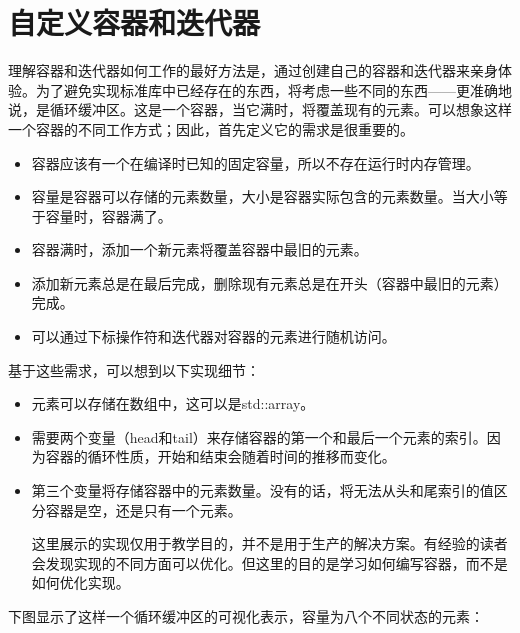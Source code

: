 \section{自定义容器和迭代器}

理解容器和迭代器如何工作的最好方法是，通过创建自己的容器和迭代器来亲身体验。为了避免实现标准库中已经存在的东西，将考虑一些不同的东西——更准确地说，是循环缓冲区。这是一个容器，当它满时，将覆盖现有的元素。可以想象这样一个容器的不同工作方式；因此，首先定义它的需求是很重要的。

\begin{itemize}
\item
容器应该有一个在编译时已知的固定容量，所以不存在运行时内存管理。

\item
容量是容器可以存储的元素数量，大小是容器实际包含的元素数量。当大小等于容量时，容器满了。

\item
容器满时，添加一个新元素将覆盖容器中最旧的元素。

\item
添加新元素总是在最后完成，删除现有元素总是在开头（容器中最旧的元素）完成。

\item
可以通过下标操作符和迭代器对容器的元素进行随机访问。
\end{itemize}

基于这些需求，可以想到以下实现细节：

\begin{itemize}
\item
元素可以存储在数组中，这可以是std::array。

\item
需要两个变量（head和tail）来存储容器的第一个和最后一个元素的索引。因为容器的循环性质，开始和结束会随着时间的推移而变化。

\item
第三个变量将存储容器中的元素数量。没有的话，将无法从头和尾索引的值区分容器是空，还是只有一个元素。

\begin{important}
这里展示的实现仅用于教学目的，并不是用于生产的解决方案。有经验的读者会发现实现的不同方面可以优化。但这里的目的是学习如何编写容器，而不是如何优化实现。
\end{important}

\end{itemize}

下图显示了这样一个循环缓冲区的可视化表示，容量为八个不同状态的元素：

